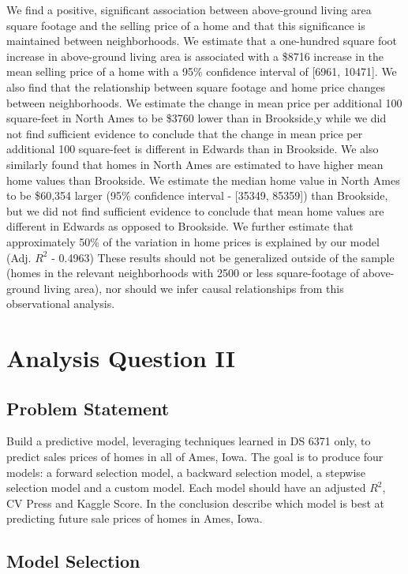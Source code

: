 \documentclass[american,]{article}
\begin{document}
We find a positive, significant association between above-ground living
area square footage and the selling price of a home and that this
significance is maintained between neighborhoods. We estimate that a
one-hundred square foot increase in above-ground living area is
associated with a \$8716 increase in the mean selling price of a home
with a 95\% confidence interval of {[}6961, 10471{]}. We also find that
the relationship between square footage and home price changes between
neighborhoods. We estimate the change in mean price per additional 100
square-feet in North Ames to be \$3760 lower than in Brookside,y while
we did not find sufficient evidence to conclude that the change in mean
price per additional 100 square-feet is different in Edwards than in
Brookside. We also similarly found that homes in North Ames are
estimated to have higher mean home values than Brookside. We estimate
the median home value in North Ames to be \$60,354 larger (95\%
confidence interval - {[}35349, 85359{]}) than Brookside, but we did not
find sufficient evidence to conclude that mean home values are different
in Edwards as opposed to Brookside. We further estimate that
approximately 50\% of the variation in home prices is explained by our
model (Adj. \(R^2\) - 0.4963) These results should not be generalized
outside of the sample (homes in the relevant neighborhoods with 2500 or
less square-footage of above-ground living area), nor should we infer
causal relationships from this observational analysis.

\section{Analysis Question II}\label{analysis-question-ii}

\subsection{Problem Statement}\label{problem-statement-1}

Build a predictive model, leveraging techniques learned in DS 6371 only,
to predict sales prices of homes in all of Ames, Iowa. The goal is to
produce four models: a forward selection model, a backward selection
model, a stepwise selection model and a custom model. Each model should
have an adjusted \(R^{2}\), CV Press and Kaggle Score. In the conclusion
describe which model is best at predicting future sale prices of homes
in Ames, Iowa.

\subsection{Model Selection}\label{model-selection}
\end{document}

